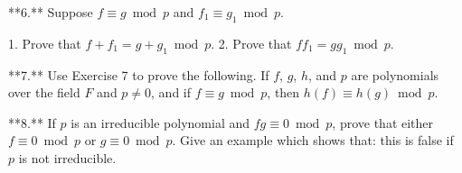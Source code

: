 **6.** Suppose \(f\equiv g\bmod p\) and \(f_{1}\equiv g_{1}\bmod p\).

1. Prove that \(f+f_{1}=g+g_{1}\bmod p\).
2. Prove that \(f\!f_{1}=gg_{1}\bmod p\).

**7.** Use Exercise 7 to prove the following. If \(f\), \(g\), \(h\), and \(p\) are polynomials over the field \(F\) and \(p\neq 0\), and if \(f\equiv g\bmod p\), then \(h(f)\equiv h(g)\bmod p\).

**8.** If \(p\) is an irreducible polynomial and \(fg\equiv 0\bmod p\), prove that either \(f\equiv 0\bmod p\) or \(g\equiv 0\bmod p\). Give an example which shows that: this is false if \(p\) is not irreducible.

 